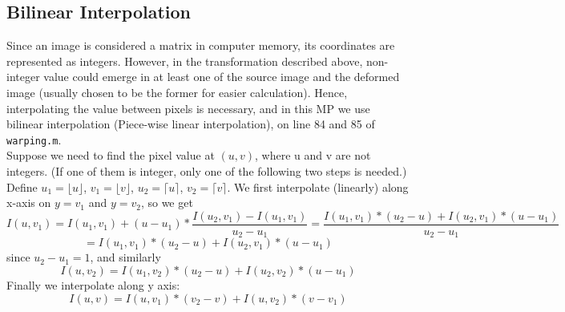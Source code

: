 \documentclass{article}
\begin{document}
	\subsection{Bilinear Interpolation}
	Since an image is considered a matrix in computer memory, its coordinates are represented as integers. However, in the transformation described above, non-integer value could emerge in at least one of the source image and the deformed image (usually chosen to be the former for easier calculation). Hence, interpolating the value between pixels is necessary, and in this MP we use bilinear interpolation (Piece-wise linear interpolation), on line 84 and 85 of \texttt{warping.m}.\\
	Suppose we need to find the pixel value at $(u,v)$, where u and v are not integers. (If one of them is integer, only one of the following two steps is needed.) Define $u_1=\lfloor u \rfloor$, $v_1=\lfloor v \rfloor$, $u_2=\lceil u \rceil$, $v_2=\lceil v \rceil$. We first interpolate (linearly) along x-axis on $y=v_1$ and $y=v_2$, so we get\\
	
	$$I(u,v_1)=I(u_1,v_1)+(u-u_1)*\frac{I(u_2,v_1)-I(u_1,v_1)}{u_2-u_1}=\frac{I(u_1,v_1)*(u_2-u)+I(u_2,v_1)*(u-u_1)}{u_2-u_1}$$
	$$=I(u_1,v_1)*(u_2-u)+I(u_2,v_1)*(u-u_1)$$ since $u_2-u_1=1$, and similarly
	$$I(u,v_2)=I(u_1,v_2)*(u_2-u)+I(u_2,v_2)*(u-u_1)$$
	Finally we interpolate along y axis:
	\begin{equation}
	I(u,v)=I(u,v_1)*(v_2-v)+I(u,v_2)*(v-v_1)
	\end{equation}
	
	
\end{document}
